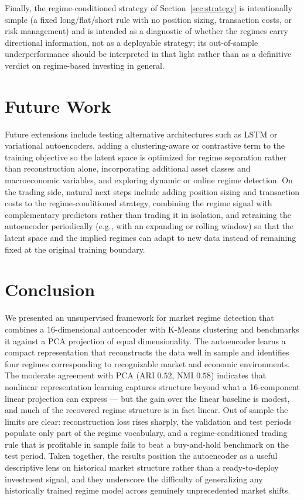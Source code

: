 \documentclass[conference]{IEEEtran}
\begin{document}
Finally, the regime-conditioned strategy of Section~\ref{sec:strategy} is
intentionally simple (a fixed long/flat/short rule with no position sizing,
transaction costs, or risk management) and is intended as a diagnostic of whether
the regimes carry directional information, not as a deployable strategy; its
out-of-sample underperformance should be interpreted in that light rather than as
a definitive verdict on regime-based investing in general.

\section{Future Work}

Future extensions include testing alternative architectures such as LSTM or
variational autoencoders, adding a clustering-aware or contrastive term to the
training objective so the latent space is optimized for regime separation rather
than reconstruction alone, incorporating additional asset classes and
macroeconomic variables, and exploring dynamic or online regime detection. On the trading side, natural next steps include adding position
sizing and transaction costs to the regime-conditioned strategy, combining the
regime signal with complementary predictors rather than trading it in
isolation, and retraining the autoencoder periodically (e.g., with an
expanding or rolling window) so that the latent space and the implied regimes
can adapt to new data instead of remaining fixed at the original training
boundary.

\section{Conclusion}

We presented an unsupervised framework for market regime detection that combines
a 16-dimensional autoencoder with K-Means clustering and benchmarks it against
a PCA projection of equal dimensionality. The autoencoder learns a compact
representation that reconstructs the data well in sample and identifies four
regimes corresponding to recognizable market and economic environments. The
moderate agreement with PCA (ARI $0.52$, NMI $0.58$) indicates that nonlinear
representation learning captures structure beyond what a 16-component linear
projection can express --- but the gain over the linear baseline is modest, and
much of the recovered regime structure is in fact linear. Out of sample the
limits are clear: reconstruction loss rises sharply, the validation and test
periods populate only part of the regime vocabulary, and a regime-conditioned
trading rule that is profitable in sample fails to beat a buy-and-hold benchmark
on the test period. Taken together, the results position the autoencoder as a
useful descriptive lens on historical market structure rather than a
ready-to-deploy investment signal, and they underscore the difficulty of
generalizing any historically trained regime model across genuinely unprecedented
market shifts.
\end{document}

